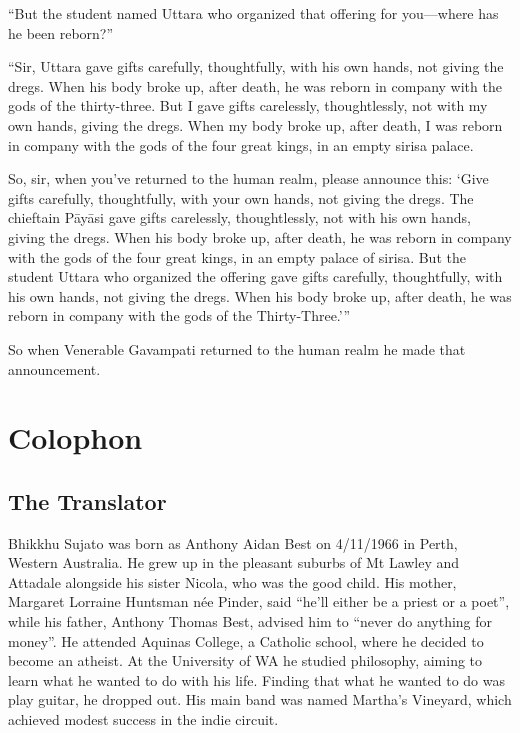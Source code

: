 \documentclass[12pt,openany]{book}%
\let\oldbackmatter\backmatter
\renewcommand{\backmatter}{%
\chapterfont{\setstretch{.85}\normalfont\centering}%
\sectionfont{\setstretch{.85}\normalfont\BalancedRagged}%
\pagestyle{plainer}%
\oldbackmatter}
\begin{document}
“But the student named Uttara who organized that offering for you—where has he been reborn?” 

“Sir, Uttara gave gifts carefully, thoughtfully, with his own hands, not giving the dregs. When his body broke up, after death, he was reborn in company with the gods of the thirty-three. But I gave gifts carelessly, thoughtlessly, not with my own hands, giving the dregs. When my body broke up, after death, I was reborn in company with the gods of the four great kings, in an empty sirisa palace. 

So, sir, when you’ve returned to the human realm, please announce this: ‘Give gifts carefully, thoughtfully, with your own hands, not giving the dregs. The chieftain \textsanskrit{Pāyāsi} gave gifts carelessly, thoughtlessly, not with his own hands, giving the dregs. When his body broke up, after death, he was reborn in company with the gods of the four great kings, in an empty palace of sirisa. But the student Uttara who organized the offering gave gifts carefully, thoughtfully, with his own hands, not giving the dregs. When his body broke up, after death, he was reborn in company with the gods of the Thirty-Three.’” 

So when Venerable Gavampati returned to the human realm he made that announcement. 

%
\backmatter%
%
\chapter*{Colophon}

\section*{The Translator}

Bhikkhu Sujato was born as Anthony Aidan Best on 4/11/1966 in Perth, Western Australia. He grew up in the pleasant suburbs of Mt Lawley and Attadale alongside his sister Nicola, who was the good child. His mother, Margaret Lorraine Huntsman née Pinder, said “he’ll either be a priest or a poet”, while his father, Anthony Thomas Best, advised him to “never do anything for money”. He attended Aquinas College, a Catholic school, where he decided to become an atheist. At the University of WA he studied philosophy, aiming to learn what he wanted to do with his life. Finding that what he wanted to do was play guitar, he dropped out. His main band was named Martha’s Vineyard, which achieved modest success in the indie circuit. 
\end{document}
